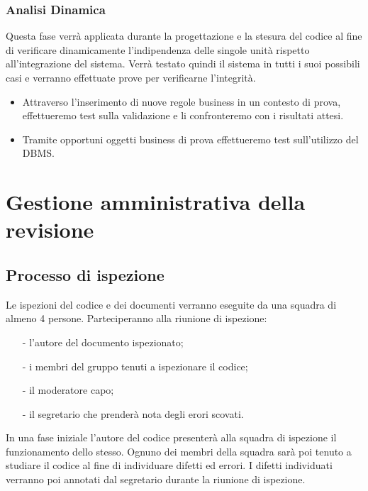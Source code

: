 \documentclass[11pt,titlepage,a4paper]{report}
\begin{document}
\subsection{Analisi Dinamica}
Questa fase verr\`a applicata durante la progettazione e la stesura del codice al fine di verificare dinamicamente l'indipendenza delle singole unit\`a rispetto all'integrazione del sistema. Verr\`a testato quindi il sistema in tutti i suoi possibili casi e verranno effettuate prove per verificarne l'integrit\`a.
\begin{itemize}
\item Attraverso l'inserimento di nuove regole business in un contesto di prova, effettueremo test sulla validazione e li confronteremo con i risultati attesi.
\item Tramite opportuni oggetti business di prova effettueremo test sull'utilizzo del DBMS.
\end{itemize}

\chapter[Gestione revisione]{Gestione amministrativa della revisione} 
\section{Processo di ispezione}
Le ispezioni del codice e dei documenti verranno eseguite da una squadra di almeno 4 persone. Parteciperanno alla riunione di ispezione: 
\begin{itemize}
\item[-]l'autore del documento ispezionato;
\item[-]i membri del gruppo tenuti a ispezionare il codice;
\item[-]il moderatore capo;
\item[-]il segretario che prender\`a nota degli erori scovati.
\end{itemize}
In una fase iniziale l'autore del codice presenter\`a alla squadra di ispezione il funzionamento dello stesso. Ognuno dei membri della squadra sar\`a poi tenuto a studiare il codice al fine di individuare difetti ed errori. I difetti individuati verranno poi annotati dal segretario durante la riunione di ispezione. 
\end{document}
